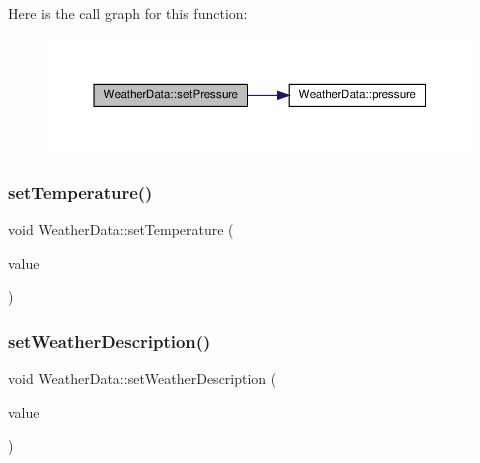 Here is the call graph for this function\+:\nopagebreak
\begin{figure}[H]
\begin{center}
\leavevmode
\includegraphics[width=350pt]{class_weather_data_ad5b453016656864e2bc3a09fc75919a0_cgraph}
\end{center}
\end{figure}
\mbox{\label{class_weather_data_afee514cbb8713059cf8d0602b33cadf5}} 
\subsubsection{\texorpdfstring{set\+Temperature()}{setTemperature()}}
{\footnotesize\ttfamily void Weather\+Data\+::set\+Temperature (\begin{DoxyParamCaption}\item[{const Q\+String \&}]{value }\end{DoxyParamCaption})}

\mbox{\label{class_weather_data_a68686722f2e0bbf5cb28f0fdc96e280d}} 
\subsubsection{\texorpdfstring{set\+Weather\+Description()}{setWeatherDescription()}}
{\footnotesize\ttfamily void Weather\+Data\+::set\+Weather\+Description (\begin{DoxyParamCaption}\item[{const Q\+String \&}]{value }\end{DoxyParamCaption})}

\mbox{\label{class_weather_data_a2a8093aaf20e1fb3c63c429a4ae0a977}} 
